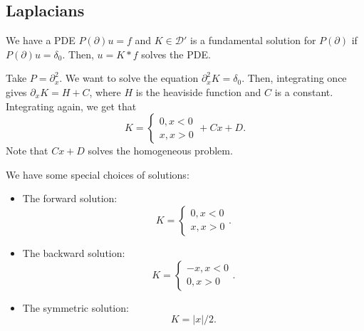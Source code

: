 \documentclass[11pt]{scrartcl}
\begin{document}
\subsection{Laplacians}
We have a PDE $P(\partial) u = f$ and $K \in \mathcal D'$ is a fundamental solution for $P(\partial)$ if $P(\partial)u = \delta_0$.  Then, $u = K * f$ solves the PDE.

\begin{example}[1D Laplacian] Take $P = \partial_x^2$.  We want to solve the equation $\partial_x^2 K = \delta_0$.  Then, integrating once gives $\partial_x K = H + C$, where $H$ is the heaviside function and $C$ is a constant. Integrating again, we get that $$K = \begin{cases}0, x < 0 \\ x, x > 0\end{cases}+Cx + D.$$
Note that $Cx+D$ solves the homogeneous problem.  

We have some special choices of solutions: 
\begin{itemize}
\item The forward solution: $$K = \begin{cases} 0, x < 0 \\ x, x > 0 \end{cases}.$$
\item The backward solution: $$K = \begin{cases} -x, x < 0 \\ 0, x > 0 \end{cases}.$$
\item The symmetric solution: $$K = |x|/2.$$

\end{itemize}
\end{example}
\end{document}
